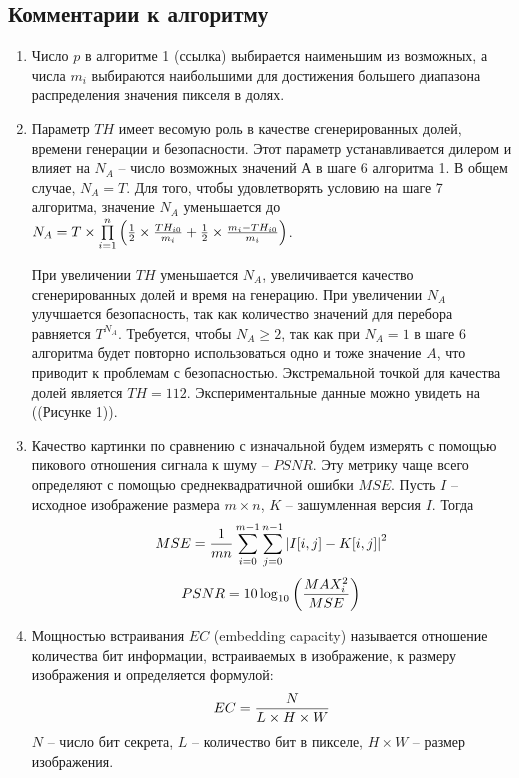 \documentclass[a4paper,article,14pt]{extarticle}
\begin{document}
\subsection{Комментарии к алгоритму}
\begin{enumerate}
    \item Число $p$ в алгоритме 1 (ссылка) выбирается наименьшим из возможных, а числа $m_i$ выбираются наибольшими для достижения 
    большего диапазона распределения значения пикселя в долях.

    \item Параметр $TH$ имеет весомую роль в качестве сгенерированных долей, времени генерации и безопасности. Этот параметр устанавливается 
    дилером и влияет на $N_A$ -- число возможных значений А в шаге 6 алгоритма 1.
    В общем случае, $N_A = T$. Для того, чтобы удовлетворять условию на шаге 7 алгоритма, значение $N_A$ уменьшается до 
    $N_A = T \times \prod\limits_{i = 1}^n \left({1\over 2} \times {TH_{i0}\over m_i} + {1\over 2} \times {{m_i - TH_{i0}}\over m_i}\right)$.
    
    При увеличении $TH$ уменьшается $N_A$, увеличивается качество сгенерированных долей и время на генерацию.
    При увеличении $N_A$ улучшается безопасность, так как количество значений для перебора равняется $T^{N_A}$. 
    Требуется, чтобы $N_A \geq 2$, так как при $N_A = 1$ в шаге 6 алгоритма будет 
    повторно использоваться одно и тоже значение $A$, что приводит к проблемам с безопасностью. Экстремальной точкой для качества долей 
    является $TH = 112$. Экспериментальные данные можно увидеть на ((Рисунке 1)). 

    \item Качество картинки по сравнению с изначальной будем измерять с помощью пикового отношения сигнала к шуму -- $PSNR$. Эту метрику чаще всего 
    определяют с помощью среднеквадратичной ошибки $MSE$. Пусть $I$ -- исходное изображение размера $m \times n$, $K$ -- зашумленная версия $I$. Тогда 
    \begin{equation}
        MSE = {1\over mn} \sum_{i=0}^{m-1} \sum_{j=0}^{n-1}{|I[i, j] - K[i, j]|}^2
    \end{equation}
    \begin{equation}
        PSNR = 10 \log_{10}\left({{MAX_i^2} \over {MSE}} \right)
    \end{equation}

    \item Мощностью встраивания $EC$ (embedding capacity) называется отношение количества бит информации, встраиваемых в изображение, к размеру изображения 
    и определяется формулой:
    $$EC = {N\over{L\times H \times W}}$$
    $N$ -- число бит секрета, $L$ -- количество бит в пикселе, $H \times W$ -- размер изображения.
    

\end{enumerate}
\end{document}
